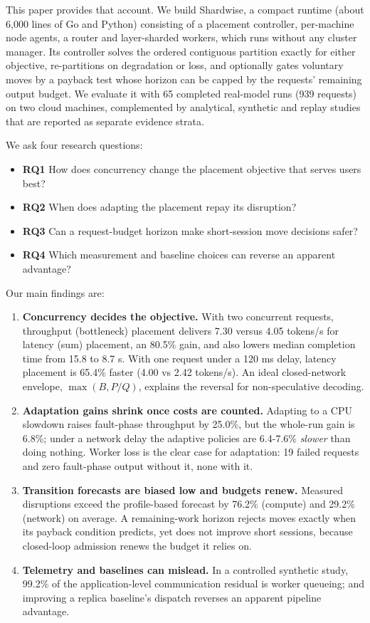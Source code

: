 \documentclass[preprint,12pt]{elsarticle}
\newcommand{\tightlist}{\setlength{\itemsep}{0pt}\setlength{\parskip}{0pt}}
\begin{document}
This paper provides that account. We build Shardwise, a compact runtime
(about 6,000 lines of Go and Python) consisting of a placement
controller, per-machine node agents, a router and layer-sharded workers,
which runs without any cluster manager. Its controller solves the
ordered contiguous partition exactly for either objective, re-partitions
on degradation or loss, and optionally gates voluntary moves by a
payback test whose horizon can be capped by the requests' remaining
output budget. We evaluate it with 65 completed real-model runs (939
requests) on two cloud machines, complemented by analytical, synthetic
and replay studies that are reported as separate evidence strata.

We ask four research questions:

\begin{itemize}
\tightlist
\item
  \textbf{RQ1} How does concurrency change the placement objective that
  serves users best?
\item
  \textbf{RQ2} When does adapting the placement repay its disruption?
\item
  \textbf{RQ3} Can a request-budget horizon make short-session move
  decisions safer?
\item
  \textbf{RQ4} Which measurement and baseline choices can reverse an
  apparent advantage?
\end{itemize}

Our main findings are:

\begin{enumerate}
\def\labelenumi{\arabic{enumi}.}
\tightlist
\item
  \textbf{Concurrency decides the objective.} With two concurrent
  requests, throughput (bottleneck) placement delivers 7.30 versus 4.05
  tokens/s for latency (sum) placement, an 80.5\% gain, and also lowers
  median completion time from 15.8 to 8.7 s. With one request under a
  120 ms delay, latency placement is 65.4\% faster (4.00 vs 2.42
  tokens/s). An ideal closed-network envelope, \(\max(B,P/Q)\), explains
  the reversal for non-speculative decoding.
\item
  \textbf{Adaptation gains shrink once costs are counted.} Adapting to a
  CPU slowdown raises fault-phase throughput by 25.0\%, but the
  whole-run gain is 6.8\%; under a network delay the adaptive policies
  are 6.4-7.6\% \emph{slower} than doing nothing. Worker loss is the
  clear case for adaptation: 19 failed requests and zero fault-phase
  output without it, none with it.
\item
  \textbf{Transition forecasts are biased low and budgets renew.}
  Measured disruptions exceed the profile-based forecast by 76.2\%
  (compute) and 29.2\% (network) on average. A remaining-work horizon
  rejects moves exactly when its payback condition predicts, yet does
  not improve short sessions, because closed-loop admission renews the
  budget it relies on.
\item
  \textbf{Telemetry and baselines can mislead.} In a controlled
  synthetic study, 99.2\% of the application-level communication
  residual is worker queueing; and improving a replica baseline's
  dispatch reverses an apparent pipeline advantage.
\end{enumerate}
\end{document}
